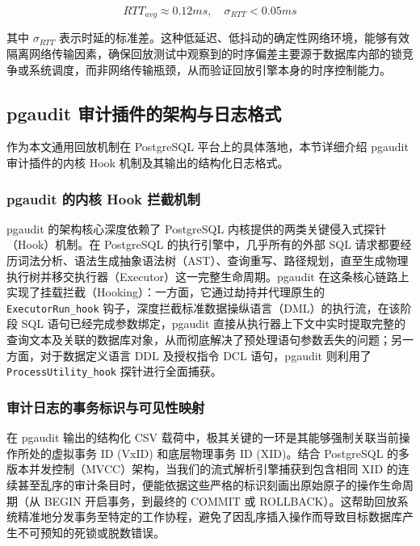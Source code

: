 \begin{equation}
\label{eq:network_latency}
RTT_{avg} \approx 0.12ms, \quad \sigma_{RTT} < 0.05ms
\end{equation}

其中 $\sigma_{RTT}$ 表示时延的标准差。这种低延迟、低抖动的确定性网络环境，能够有效隔离网络传输因素，确保回放测试中观察到的时序偏差主要源于数据库内部的锁竞争或系统调度，而非网络传输瓶颈，从而验证回放引擎本身的时序控制能力。

\subsection{pgaudit 审计插件的架构与日志格式}

作为本文通用回放机制在 PostgreSQL 平台上的具体落地，本节详细介绍 pgaudit 审计插件的内核 Hook 机制及其输出的结构化日志格式。

\subsubsection{pgaudit 的内核 Hook 拦截机制}

pgaudit 的架构核心深度依赖了 PostgreSQL 内核提供的两类关键侵入式探针（Hook）机制。在 PostgreSQL 的执行引擎中，几乎所有的外部 SQL 请求都要经历词法分析、语法生成抽象语法树（AST）、查询重写、路径规划，直至生成物理执行树并移交执行器（Executor）这一完整生命周期。pgaudit 在这条核心链路上实现了挂载拦截（Hooking）：一方面，它通过劫持并代理原生的 \texttt{ExecutorRun\_hook} 钩子，深度拦截标准数据操纵语言（DML）的执行流，在该阶段 SQL 语句已经完成参数绑定，pgaudit 直接从执行器上下文中实时提取完整的查询文本及关联的数据库对象，从而彻底解决了预处理语句参数丢失的问题；另一方面，对于数据定义语言 DDL 及授权指令 DCL 语句，pgaudit 则利用了 \texttt{ProcessUtility\_hook} 探针进行全面捕获。

\subsubsection{审计日志的事务标识与可见性映射}

在 pgaudit 输出的结构化 CSV 载荷中，极其关键的一环是其能够强制关联当前操作所处的虚拟事务 ID (VxID) 和底层物理事务 ID (XID)。结合 PostgreSQL 的多版本并发控制（MVCC）\cite{MVCC}架构，当我们的流式解析引擎捕获到包含相同 XID 的连续甚至乱序的审计条目时，便能依据这些严格的标识刻画出原始原子的操作生命周期（从 BEGIN 开启事务，到最终的 COMMIT 或 ROLLBACK）。这帮助回放系统精准地分发事务至特定的工作协程，避免了因乱序插入操作而导致目标数据库产生不可预知的死锁或脱数错误。

